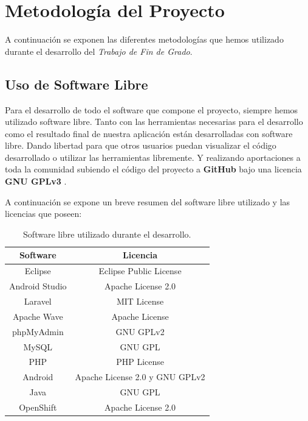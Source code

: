\newpage
\thispagestyle{sectioned}
\chapter{Metodología del Proyecto}

A continuación se exponen las diferentes metodologías que hemos utilizado durante el desarrollo del \textit{Trabajo de Fin de Grado}.

\section{Uso de Software Libre}

Para el desarrollo de todo el software que compone el proyecto, siempre hemos utilizado software libre. Tanto con las herramientas necesarias para el desarrollo como el resultado final de nuestra aplicación están desarrolladas con software libre. Dando libertad para que otros usuarios puedan visualizar el código desarrollado o utilizar las herramientas libremente. Y realizando aportaciones a toda la comunidad subiendo el código del proyecto a \textbf{GitHub} bajo una licencia \textbf{GNU GPLv3} \cite{ref:GPLv3}.

A continuación se expone un breve resumen del software libre utilizado y las licencias que poseen:

\begin{table}[h]
\centering
\begin{tabular}{|c|c|}
\hline
{\bf Software} & {\bf Licencia}                 \\ \hline
Eclipse        & Eclipse Public License         \\ \hline
Android Studio & Apache License 2.0             \\ \hline
Laravel        & MIT License                    \\ \hline
Apache Wave    & Apache License                 \\ \hline
phpMyAdmin     & GNU GPLv2                      \\ \hline
MySQL          & GNU GPL                        \\ \hline
PHP            & PHP License                    \\ \hline
Android        & Apache License 2.0 y GNU GPLv2 \\ \hline
Java           & GNU GPL                        \\ \hline
OpenShift      & Apache License 2.0             \\ \hline
\end{tabular}
\caption{Software libre utilizado durante el desarrollo.}
\end{table}

